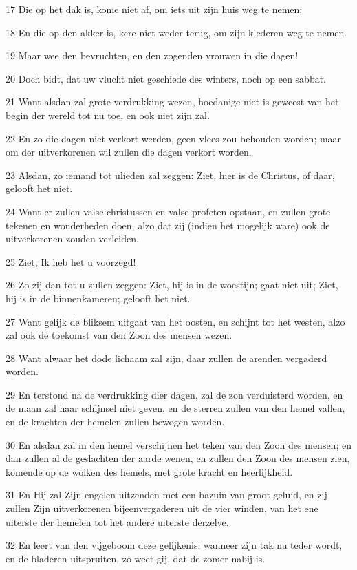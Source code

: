 \par 17 Die op het dak is, kome niet af, om iets uit zijn huis weg te nemen;
\par 18 En die op den akker is, kere niet weder terug, om zijn klederen weg te nemen.
\par 19 Maar wee den bevruchten, en den zogenden vrouwen in die dagen!
\par 20 Doch bidt, dat uw vlucht niet geschiede des winters, noch op een sabbat.
\par 21 Want alsdan zal grote verdrukking wezen, hoedanige niet is geweest van het begin der wereld tot nu toe, en ook niet zijn zal.
\par 22 En zo die dagen niet verkort werden, geen vlees zou behouden worden; maar om der uitverkorenen wil zullen die dagen verkort worden.
\par 23 Alsdan, zo iemand tot ulieden zal zeggen: Ziet, hier is de Christus, of daar, gelooft het niet.
\par 24 Want er zullen valse christussen en valse profeten opstaan, en zullen grote tekenen en wonderheden doen, alzo dat zij (indien het mogelijk ware) ook de uitverkorenen zouden verleiden.
\par 25 Ziet, Ik heb het u voorzegd!
\par 26 Zo zij dan tot u zullen zeggen: Ziet, hij is in de woestijn; gaat niet uit; Ziet, hij is in de binnenkameren; gelooft het niet.
\par 27 Want gelijk de bliksem uitgaat van het oosten, en schijnt tot het westen, alzo zal ook de toekomst van den Zoon des mensen wezen.
\par 28 Want alwaar het dode lichaam zal zijn, daar zullen de arenden vergaderd worden.
\par 29 En terstond na de verdrukking dier dagen, zal de zon verduisterd worden, en de maan zal haar schijnsel niet geven, en de sterren zullen van den hemel vallen, en de krachten der hemelen zullen bewogen worden.
\par 30 En alsdan zal in den hemel verschijnen het teken van den Zoon des mensen; en dan zullen al de geslachten der aarde wenen, en zullen den Zoon des mensen zien, komende op de wolken des hemels, met grote kracht en heerlijkheid.
\par 31 En Hij zal Zijn engelen uitzenden met een bazuin van groot geluid, en zij zullen Zijn uitverkorenen bijeenvergaderen uit de vier winden, van het ene uiterste der hemelen tot het andere uiterste derzelve.
\par 32 En leert van den vijgeboom deze gelijkenis: wanneer zijn tak nu teder wordt, en de bladeren uitspruiten, zo weet gij, dat de zomer nabij is.
